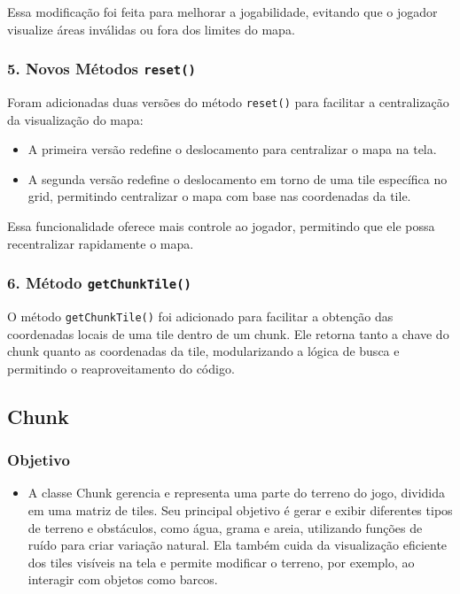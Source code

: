 \documentclass[
	12pt,				%
	oneside,			%
	a4paper,			%
	english,			%
	brazil,				%
	]{abntex2}
\begin{document}
{Essa modificação foi feita para melhorar a jogabilidade, evitando que o jogador visualize áreas inválidas ou fora dos limites do mapa.

\subsubsection{5. Novos Métodos \texttt{reset()}}

Foram adicionadas duas versões do método \texttt{reset()} para facilitar a centralização da visualização do mapa:

\begin{itemize}
    \item A primeira versão redefine o deslocamento para centralizar o mapa na tela.
    \item A segunda versão redefine o deslocamento em torno de uma tile específica no grid, permitindo centralizar o mapa com base nas coordenadas da tile.
\end{itemize}

Essa funcionalidade oferece mais controle ao jogador, permitindo que ele possa recentralizar rapidamente o mapa.

\subsubsection{6. Método \texttt{getChunkTile()}}

O método \texttt{getChunkTile()} foi adicionado para facilitar a obtenção das coordenadas locais de uma tile dentro de um chunk. Ele retorna tanto a chave do chunk quanto as coordenadas da tile, modularizando a lógica de busca e permitindo o reaproveitamento do código.


\subsection{Chunk}

\subsubsection{Objetivo}

\begin{itemize}
    \item A classe Chunk gerencia e representa uma parte do terreno do jogo, dividida em uma matriz de tiles. Seu principal objetivo é gerar e exibir diferentes tipos de terreno e obstáculos, como água, grama e areia, utilizando funções de ruído para criar variação natural. Ela também cuida da visualização eficiente dos tiles visíveis na tela e permite modificar o terreno, por exemplo, ao interagir com objetos como barcos.
\end{itemize}

}
\end{document}
